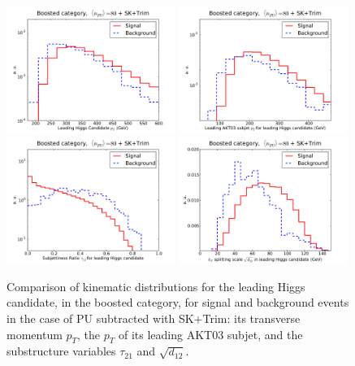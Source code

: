 \begin{figure}[t]
  \begin{center}
    \includegraphics[width=0.49\textwidth]{plots/pt_h0_bst_comp_back.pdf}
    \includegraphics[width=0.49\textwidth]{plots/pt_leadSJ_fj1_bst_comp_back.pdf}
   \includegraphics[width=0.49\textwidth]{plots/tau21_h1_bst_comp_back.pdf}
   \includegraphics[width=0.49\textwidth]{plots/split12_h0_bst_comp_back.pdf}
    \caption{\small
      Comparison of kinematic distributions for the leading
      Higgs candidate, in
     the boosted category, for signal and background events
    in the case of PU subtracted with SK+Trim:
    its transverse momentum  $p_T$,
    the $p_T$ of its leading AKT03 subjet,
    and the substructure variables $\tau_{21}$ and $\sqrt{d_{12}}$.
  }
\label{fig:signal-vs-back-boosted}
\end{center}
\end{figure}

